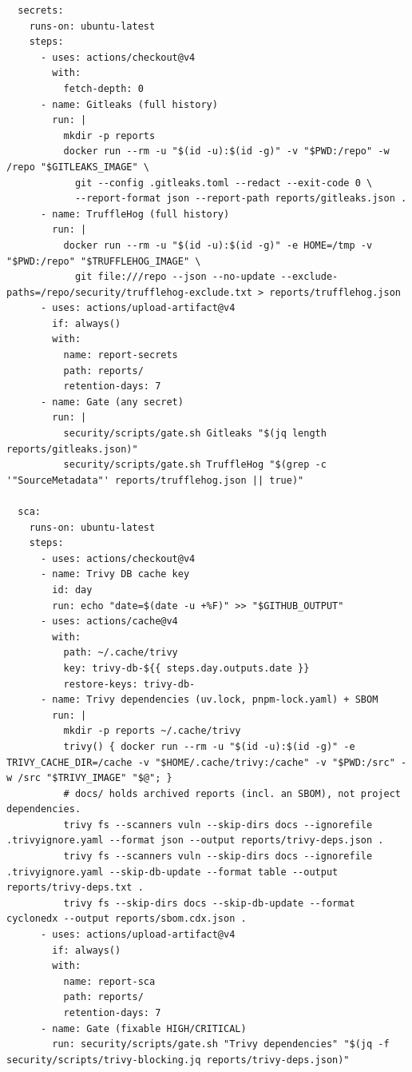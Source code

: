 \begin{lstlisting}
  secrets:
    runs-on: ubuntu-latest
    steps:
      - uses: actions/checkout@v4
        with:
          fetch-depth: 0
      - name: Gitleaks (full history)
        run: |
          mkdir -p reports
          docker run --rm -u "$(id -u):$(id -g)" -v "$PWD:/repo" -w /repo "$GITLEAKS_IMAGE" \
            git --config .gitleaks.toml --redact --exit-code 0 \
            --report-format json --report-path reports/gitleaks.json .
      - name: TruffleHog (full history)
        run: |
          docker run --rm -u "$(id -u):$(id -g)" -e HOME=/tmp -v "$PWD:/repo" "$TRUFFLEHOG_IMAGE" \
            git file:///repo --json --no-update --exclude-paths=/repo/security/trufflehog-exclude.txt > reports/trufflehog.json
      - uses: actions/upload-artifact@v4
        if: always()
        with:
          name: report-secrets
          path: reports/
          retention-days: 7
      - name: Gate (any secret)
        run: |
          security/scripts/gate.sh Gitleaks "$(jq length reports/gitleaks.json)"
          security/scripts/gate.sh TruffleHog "$(grep -c '"SourceMetadata"' reports/trufflehog.json || true)"

  sca:
    runs-on: ubuntu-latest
    steps:
      - uses: actions/checkout@v4
      - name: Trivy DB cache key
        id: day
        run: echo "date=$(date -u +%F)" >> "$GITHUB_OUTPUT"
      - uses: actions/cache@v4
        with:
          path: ~/.cache/trivy
          key: trivy-db-${{ steps.day.outputs.date }}
          restore-keys: trivy-db-
      - name: Trivy dependencies (uv.lock, pnpm-lock.yaml) + SBOM
        run: |
          mkdir -p reports ~/.cache/trivy
          trivy() { docker run --rm -u "$(id -u):$(id -g)" -e TRIVY_CACHE_DIR=/cache -v "$HOME/.cache/trivy:/cache" -v "$PWD:/src" -w /src "$TRIVY_IMAGE" "$@"; }
          # docs/ holds archived reports (incl. an SBOM), not project dependencies.
          trivy fs --scanners vuln --skip-dirs docs --ignorefile .trivyignore.yaml --format json --output reports/trivy-deps.json .
          trivy fs --scanners vuln --skip-dirs docs --ignorefile .trivyignore.yaml --skip-db-update --format table --output reports/trivy-deps.txt .
          trivy fs --skip-dirs docs --skip-db-update --format cyclonedx --output reports/sbom.cdx.json .
      - uses: actions/upload-artifact@v4
        if: always()
        with:
          name: report-sca
          path: reports/
          retention-days: 7
      - name: Gate (fixable HIGH/CRITICAL)
        run: security/scripts/gate.sh "Trivy dependencies" "$(jq -f security/scripts/trivy-blocking.jq reports/trivy-deps.json)"


\end{lstlisting}
